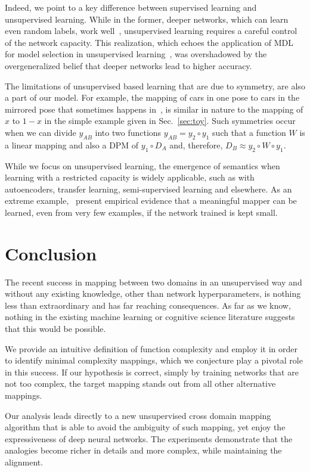 \documentclass{article} %
\begin{document}
Indeed, we point to a key difference between supervised learning and unsupervised learning. While in the former, deeper networks, which can learn even random labels, work well~\citep{rethinking},  unsupervised learning requires a careful control of the network capacity. This realization, which echoes the application of MDL for model selection in unsupervised learning~\citep{zemel1994minimum}, was overshadowed by the overgeneralized belief that deeper networks lead to higher accuracy. 
 
The limitations of unsupervised based learning that are due to symmetry, are also a part of our model. For example, the mapping of cars in one pose to cars in the mirrored pose that sometimes happens in~\citep{discogan}, is similar in nature to the mapping of $x$ to $1-x$ in the simple example given in Sec.~\ref{sec:toy}. Such symmetries occur when we can divide $y_{AB}$ into two functions $y_{AB}=y_2\circ y_1$ such that a function $W$ is a linear mapping and also a DPM of $y_1\circ D_A$ and, therefore, $D_B \approx y_2\circ W \circ y_1$.

While we focus on unsupervised learning, the emergence of semantics when learning with a restricted capacity is widely applicable, such as with autoencoders, transfer learning, semi-supervised learning and elsewhere. As an extreme example,~\cite{DBLP:journals/corr/SutskeverJGRLV15} present empirical evidence that a meaningful mapper can be learned, even from very few examples, if the network trained is kept small.

\section{Conclusion}

The recent success in mapping between two domains in an  unsupervised way and without any existing knowledge, other than network hyperparameters, is nothing less than extraordinary and has far reaching consequences. As far as we know, nothing in the existing machine learning or cognitive science literature suggests that this would be possible. 

We provide an intuitive definition of function complexity and employ it in order to identify minimal complexity mappings, which we conjecture play a pivotal role in this success. If our hypothesis is correct, simply by training networks that are not too complex, the target mapping stands out from all other alternative mappings. 

Our analysis leads directly to a new unsupervised cross domain mapping algorithm that is able to avoid the ambiguity of such mapping, yet enjoy the expressiveness of deep neural networks. The experiments demonstrate that the analogies become richer in details and more complex, while maintaining the alignment.
\end{document}
